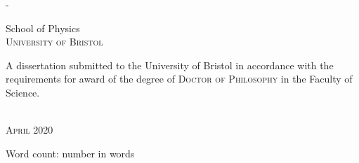 \begin{titlingpage}
\begin{SingleSpace}
\begin{adjustwidth*}{\unitlength}{-\unitlength}
\begin{center}
\vspace{6mm}
{\large School of Physics\\  %
\textsc{University of Bristol}}\\  %
\vspace{11mm}
\begin{minipage}{10cm}
A dissertation submitted to the University of Bristol in accordance with the requirements for award of the degree of \textsc{Doctor of Philosophy} in the Faculty of Science.
\end{minipage}\\
\vspace{9mm}
{\large\textsc{April 2020}}  %
\vspace{12mm}
\end{center}
\begin{flushright}
{\small Word count: number in words}  %
\end{flushright}
\end{adjustwidth*}
\end{SingleSpace}
\end{titlingpage}
